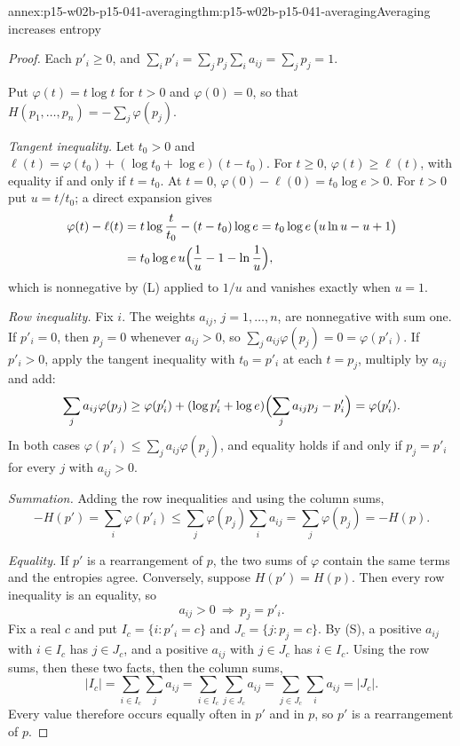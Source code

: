 \begin{annexitem}{annex:p15-w02b-p15-041-averaging}{thm:p15-w02b-p15-041-averaging}{Averaging increases entropy}
\begin{proof}
Each \(p'_i\geq0\), and
\(\sum_ip'_i=\sum_jp_j\sum_ia_{ij}=\sum_jp_j=1\).

Put \(\varphi(t)=t\log t\) for \(t>0\) and \(\varphi(0)=0\), so that
\(H(p_1,\ldots,p_n)=-\sum_j\varphi(p_j)\).

\emph{Tangent inequality.} Let \(t_0>0\) and
\(\ell(t)=\varphi(t_0)+(\log t_0+\log e)(t-t_0)\). For \(t\geq0\),
\(\varphi(t)\geq\ell(t)\), with equality if and only if \(t=t_0\).
At \(t=0\), \(\varphi(0)-\ell(0)=t_0\log e>0\). For \(t>0\) put
\(u=t/t_0\); a direct expansion gives
\begin{align*}
 \varphi(t)-\ell(t)&=t\log\frac t{t_0}-(t-t_0)\log e
   =t_0\log e\,\bigl(u\ln u-u+1\bigr)\\
   &=t_0\log e\,u\Bigl(\frac1u-1-\ln\frac1u\Bigr),
\end{align*}
which is nonnegative by (L) applied to
\(1/u\) and vanishes exactly when \(u=1\).

\emph{Row inequality.} Fix \(i\). The weights \(a_{ij}\),
\(j=1,\ldots,n\), are nonnegative with sum one. If \(p'_i=0\), then
\(p_j=0\) whenever \(a_{ij}>0\), so
\(\sum_ja_{ij}\varphi(p_j)=0=\varphi(p'_i)\). If \(p'_i>0\), apply
the tangent inequality with \(t_0=p'_i\) at each \(t=p_j\), multiply
by \(a_{ij}\) and add:
\[
 \sum_ja_{ij}\varphi(p_j)\geq\varphi(p'_i)+(\log p'_i+\log e)
   \Bigl(\sum_ja_{ij}p_j-p'_i\Bigr)=\varphi(p'_i).
\]
In both cases \(\varphi(p'_i)\leq\sum_ja_{ij}\varphi(p_j)\), and
equality holds if and only if \(p_j=p'_i\) for every \(j\) with
\(a_{ij}>0\).

\emph{Summation.} Adding the row inequalities and using the column
sums,
\[
 -H(p')=\sum_i\varphi(p'_i)\leq\sum_j\varphi(p_j)\sum_ia_{ij}
   =\sum_j\varphi(p_j)=-H(p).
\]

\emph{Equality.} If \(p'\) is a rearrangement of \(p\), the two sums
of \(\varphi\) contain the same terms and the entropies agree.
Conversely, suppose \(H(p')=H(p)\). Then every row inequality is an
equality, so
\[
 a_{ij}>0\ \Longrightarrow\ p_j=p'_i .
 \tag{S}
\]
Fix a real \(c\) and put \(I_c=\{i:p'_i=c\}\) and
\(J_c=\{j:p_j=c\}\). By (S), a
positive \(a_{ij}\) with \(i\in I_c\) has \(j\in J_c\), and a positive
\(a_{ij}\) with \(j\in J_c\) has \(i\in I_c\). Using the row sums,
then these two facts, then the column sums,
\[
 |I_c|=\sum_{i\in I_c}\sum_ja_{ij}=\sum_{i\in I_c}\sum_{j\in J_c}a_{ij}
      =\sum_{j\in J_c}\sum_ia_{ij}=|J_c|.
\]
Every value therefore occurs equally often in \(p'\) and in \(p\), so
\(p'\) is a rearrangement of \(p\).


\end{proof}
\end{annexitem}
